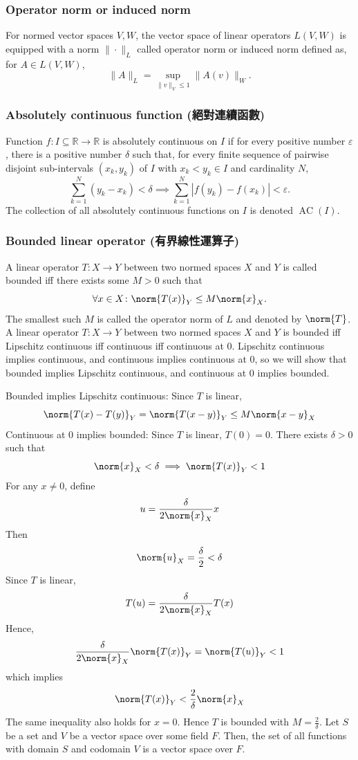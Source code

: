 \documentclass[a4paper,12pt]{report}
\begin{document}
\subsubsection{Operator norm or induced norm}
For normed vector spaces $V,W$, the vector space of linear operators $L(V,W)$ is equipped with a norm $\|\cdot\|_L$ called operator norm or induced norm defined as, for $A\in L(V,W)$,
\[\|A\|_L=\sup_{\|v\|_V\le 1}\|A(v)\|_W.\]
\subsubsection{Absolutely continuous function (絕對連續函數)}
Function $f\colon I\subseteq\mathbb{R}\to\mathbb{R}$ is absolutely continuous on $I$ if for every positive number $\varepsilon$, there is a positive number $\delta$ such that, for every finite sequence of pairwise disjoint sub-intervals $(x_k,y_k)$ of $I$ with $x_k<y_k\in I$ and cardinality $N$,
\[\sum_{k=1}^N(y_k-x_k)<\delta\implies\sum_{k=1}^N|f(y_k)-f(x_k)|<\varepsilon.\]
The collection of all absolutely continuous functions on $I$ is denoted $\operatorname {AC} (I)$.
\subsubsection{Bounded linear operator (有界線性運算子)}
A linear operator $T\colon X\to Y$ between two normed spaces $X$ and $Y$ is called bounded iff there exists some $M>0$ such that
\[\forall x\in X\colon\norm{T(x)}_Y\leq M\norm{x}_X.\]
The smallest such $M$ is called the operator norm of $L$ and denoted by $\norm{T}$.
A linear operator $T\colon X\to Y$ between two normed spaces $X$ and $Y$ is bounded iff Lipschitz continuous iff continuous iff continuous at 0.
\bpr
Lipschitz continuous implies continuous, and continuous implies continuous at 0, so we will show that bounded implies Lipschitz continuous, and continuous at 0 implies bounded.

Bounded implies Lipschitz continuous: Since $T$ is linear,
\[\norm{T(x)-T(y)}_Y=\norm{T(x-y)}_Y\le M\norm{x-y}_X\]
Continuous at 0 implies bounded: Since $T$ is linear, $T(0)=0$. There exists $\delta>0$ such that
\[\norm{x}_X<\delta\implies\norm{T(x)}_Y<1\]
For any $x\ne 0$, define
\[u=\frac{\delta}{2\norm{x}_X}x\]
Then
\[\norm{u}_X=\frac{\delta}{2}<\delta\]
Since $T$ is linear,
\[T(u)=\frac{\delta}{2\norm{x}_X}T(x)\]
Hence,
\[\frac{\delta}{2\norm{x}_X}\norm{T(x)}_Y=\norm{T(u)}_Y<1\]
which implies
\[\norm{T(x)}_Y<\frac{2}{\delta}\norm{x}_X\]
The same inequality also holds for $x=0$. Hence $T$ is bounded with $M=\frac{2}{\delta}$.
\epr
{}
Let $S$ be a set and $V$ be a vector space over some field $F$. Then, the set of all functions with domain $S$ and codomain $V$ is a vector space over $F$.
\end{document}
